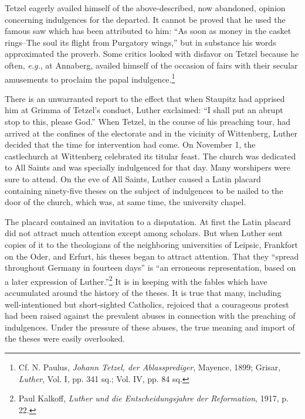Tetzel eagerly availed himself of the above-described, now abandoned,
opinion concerning indulgences for the departed. It cannot
be proved that he used the famous saw which has been attributed
to him: “As soon as money in the casket rings--The soul its flight
from Purgatory wings,” but in substance his words approximated
the proverb. Some critics looked with disfavor on Tetzel because
he often, \textit{e.g.}, at Annaberg, availed himself of the occasion of fairs
with their secular amusements to proclaim the papal indulgence.\footnote
{Cf. N. Paulus, \textit{Johann Tetzel, der Ablassprediger}, Mayence, 1899; Grisar, \textit{Luther}, Vol.
I, pp. 341 sq.; Vol. IV, pp. 84 sq.}

There is an unwarranted report to the effect that when Staupitz
had apprised him at Grimma of Tetzel’s conduct, Luther exclaimed:
“I shall put an abrupt stop to this, please God.” When Tetzel, in
the course of his preaching tour, had arrived at the confines of the
electorate and in the vicinity of Wittenberg, Luther decided that
the time for intervention had come. On November 1, the castlechurch
at Wittenberg celebrated its titular feast. The church was
dedicated to All Saints and was specially indulgenced for that day.
Many worshipers were sure to attend. On the eve of All Saints, Luther
caused a Latin placard containing ninety-five theses on the subject of
indulgences to be nailed to the door of the church, which was, at
same time, the university chapel.

The placard contained an invitation to a disputation. At first the
Latin placard did not attract much attention except among scholars.
But when Luther sent copies of it to the theologians of the neighboring
universities of Leipsic, Frankfort on the Oder, and Erfurt,
his theses began to attract attention. That they “spread throughout
Germany in fourteen days” is “an erroneous representation, based
on a later expression of Luther.”\footnote
{Paul Kalkoff, \textit{Luther und die Entscheidungsjahre der Reformation}, 1917, p. 22.}
It is in keeping with the fables
which have accumulated around the history of the theses. It is true
that many, including well-intentioned but short-sighted Catholics,
rejoiced that a courageous protest had been raised against the prevalent
abuses in connection with the preaching of indulgences. Under
the pressure of these abuses, the true meaning and import of the
theses were easily overlooked.

